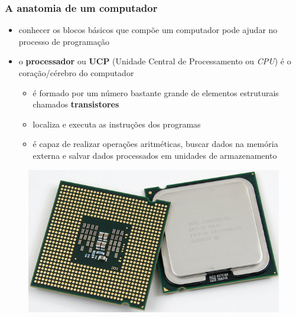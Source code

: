 \documentclass[aspectratio=169]{beamer}
\begin{document}
\begin{frame}\frametitle{A anatomia de um computador}
\begin{itemize}
	\item conhecer os blocos básicos que compõe um computador pode ajudar no processo de programação
	\item o \textbf{processador} ou \textbf{UCP} (Unidade Central de Processamento ou \emph{CPU}) é o coração/cérebro do computador
	\begin{itemize}
		\item é formado por um número bastante grande de elementos estruturais chamados \textbf{transistores}
		\item localiza e executa as instruções dos programas
		\item é capaz de realizar operações aritméticas, buscar dados na memória externa e salvar dados processados em unidades de armazenamento
	\end{itemize}
\end{itemize}
\begin{figure}[h]
	\centering
	\includegraphics[height=0.25\paperheight]{pucrs-ep-fprog-unidade_01-introducao-laminas-ucp.png}
\end{figure}
\end{frame}
\end{document}
